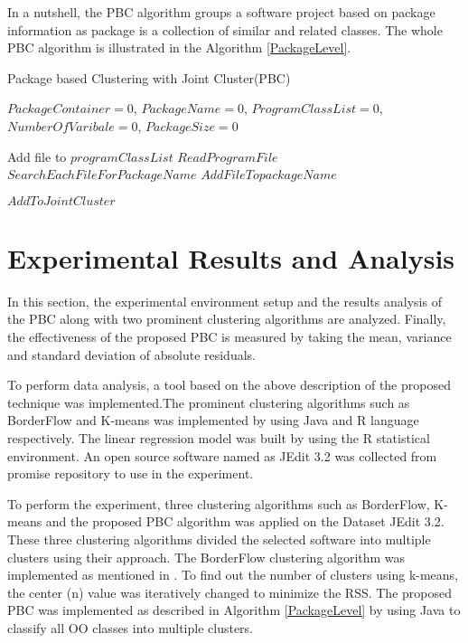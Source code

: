 \documentclass[12pt]{report}
\begin{document}
In a nutshell, the PBC algorithm groups a software project based on package information as package is a collection of similar and related classes. The whole PBC algorithm is illustrated in the Algorithm \ref{PackageLevel}.

\begin{algorithm}
\caption{Package based Clustering with Joint Cluster(PBC)}
\label{PackageLevel}
\begin{algorithmic}[1]
\REQUIRE $PackageContainer = 0$, $ PackageName = 0$, $ ProgramClassList = 0$, $NumberOfVaribale = 0$, $PackageSize = 0$

				\STATE Add file to $programClassList$
		\ENDIF
	\ENDFOR
{}
			\STATE $Read Program File$ 
			\STATE $Search Each File For PackageName $  
				\STATE $Add File To packageName$
			\ELSE{  }
			\ENDIF
	\ENDFOR
	
			\STATE $Add To Joint Cluster$
		\ENDIF
	\ENDFOR
\end{algorithmic}
\end{algorithm}
 

\section{Experimental Results and Analysis }

In this section, the experimental environment setup and the results analysis of the PBC along with two prominent clustering algorithms are analyzed. Finally, the effectiveness of the proposed PBC is measured by taking the mean, variance and standard deviation of absolute residuals. 

To perform data analysis, a tool based on the above description of the proposed technique was implemented.The prominent clustering algorithms such as BorderFlow and K-means was implemented by using Java and R language respectively. The linear regression model was built by using the R statistical environment. An open source software named as JEdit 3.2 was collected from promise repository \cite{promise12} to use in the experiment.

To perform the experiment, three clustering algorithms such as BorderFlow, K-means and the proposed PBC algorithm was applied on the Dataset JEdit 3.2. These three clustering algorithms divided the selected software into multiple clusters using their approach. The BorderFlow clustering algorithm was implemented as mentioned in \cite{scanniello2013class}. To find out the number of clusters using k-means, the center (n) value was iteratively changed to minimize the RSS. The proposed PBC was implemented as described in Algorithm \ref{PackageLevel} by using Java to classify all OO classes into multiple clusters.
\end{document}
